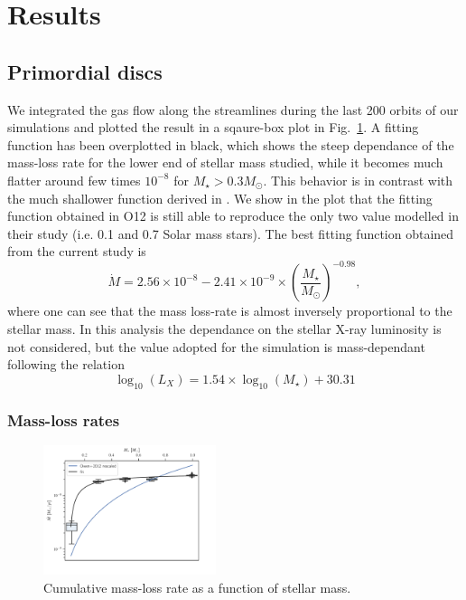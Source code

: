 \documentclass{aa}
\begin{document}
\section{Results}

\subsection{Primordial discs}

We integrated the gas flow along the streamlines during the last 200 orbits of our simulations and plotted the result in a sqaure-box plot in Fig.~\ref{fig:Mdot}. A fitting function has been overplotted in black, which shows the steep dependance of the mass-loss rate for the lower end of stellar mass studied, while it becomes much flatter around few times $10^{-8}$ for $M_\star > 0.3 M_\odot$. This behavior is in contrast with the much shallower function derived in \citep{Owen2012}. We show in the plot that the fitting function obtained in O12 is still able to reproduce the only two value modelled in their study (i.e. 0.1 and 0.7 Solar mass stars).
The best fitting function obtained from the current study is
\begin{equation}
  \dot{M} = 2.56\times10^{-8} - 2.41\times10^{-9}\times\left(\frac{M_\star}{M_\odot}\right)^{-0.98},
\end{equation}
where one can see that the mass loss-rate is almost inversely proportional to the stellar mass.
In this analysis the dependance on the stellar X-ray luminosity is not considered, but the value adopted for the simulation is mass-dependant following the relation
\begin{equation}
	\log_{10}{(L_X)} = 1.54\times \log_{10}{(M_\star)} + 30.31
\end{equation}

\subsubsection{Mass-loss rates}
\begin{figure}
  \centering
  \includegraphics[width=0.45\textwidth]{mdot}
  \caption{Cumulative mass-loss rate as a function of stellar mass. \label{fig:Mdot}}
\end{figure}
\end{document}
